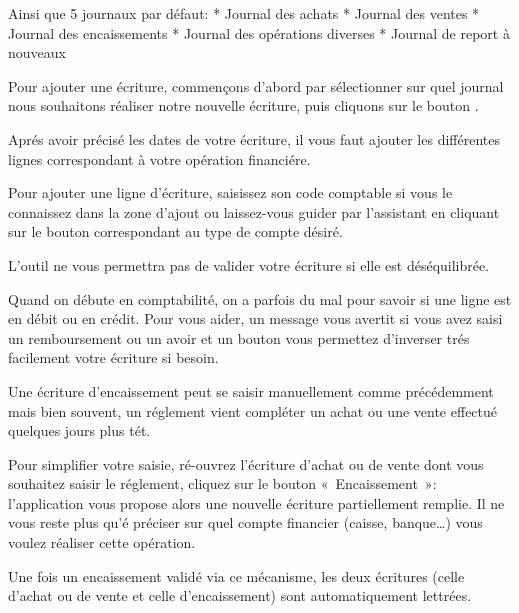 \documentclass[a4paper,10pt,oneside,french]{sphinxmanual}
\begin{document}
Ainsi que 5 journaux par défaut:
* Journal des achats
* Journal des ventes
* Journal des encaissements
* Journal des opérations diverses
* Journal de report à nouveaux

Pour ajouter une écriture, commençons d’abord par sélectionner sur quel
journal nous souhaitons réaliser notre nouvelle écriture, puis cliquons
sur le bouton .

Aprés avoir précisé les dates de votre écriture, il vous faut
ajouter les différentes lignes correspondant à votre opération financiére.

Pour ajouter une ligne d’écriture, saisissez son code comptable
si vous le connaissez dans la zone d’ajout ou laissez-vous guider par
l’assistant en cliquant sur le bouton correspondant au type de compte désiré.
\begin{quote}

\noindent{}
\end{quote}

L’outil ne vous permettra pas de valider votre écriture si elle est déséquilibrée.

Quand on débute en comptabilité, on a parfois du mal pour savoir si une ligne est en débit ou en crédit. Pour vous aider, un message
vous avertit si vous avez saisi un remboursement ou un avoir et un bouton vous permettez d’inverser trés facilement votre écriture si besoin.
\begin{quote}

\end{quote}

Une écriture d’encaissement peut se saisir manuellement comme précédemment mais bien souvent, un réglement vient compléter un achat ou une vente effectué quelques jours plus tét.

Pour simplifier votre saisie, ré-ouvrez l’écriture d’achat ou de vente dont vous souhaitez saisir le réglement, cliquez sur le bouton « Encaissement »: l’application vous propose alors une nouvelle écriture
partiellement remplie. Il ne vous reste plus qu’é préciser sur quel compte financier (caisse, banque…) vous voulez réaliser cette opération.

Une fois un encaissement validé via ce mécanisme, les deux écritures (celle d’achat ou de vente et celle d’encaissement) sont automatiquement lettrées.
\begin{quote}

\end{quote}
\end{document}

